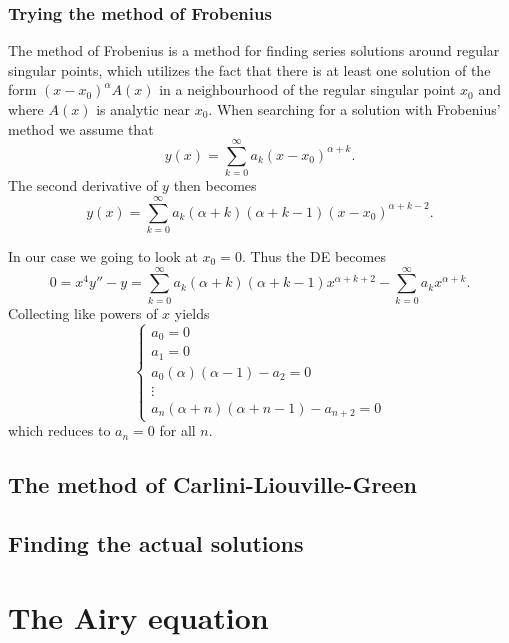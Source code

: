 \documentclass[11pt,letter, swedish, english
]{article}
\begin{document}
\subsubsection{Trying the method of Frobenius}
The method of Frobenius is a method for finding series solutions around
regular singular points, which utilizes the fact that there is 
at least one solution of the form $(x-x_0)^{\alpha}A(x)$ in a
neighbourhood of the regular singular point $x_0$ and where $A(x)$ is
analytic near $x_0$. When searching for a solution with Frobenius'
method we assume that
\begin{equation}
y(x)=\sum_{k=0}^\infty a_k (x-x_0)^{\alpha+k}.
\end{equation}
The second derivative of $y$ then becomes
\begin{equation}
y(x)=\sum_{k=0}^\infty a_k (\alpha+k)(\alpha+k-1) (x-x_0)^{\alpha+k-2}.
\end{equation}

In our case we going to look at $x_0=0$. Thus the DE becomes
\begin{equation}
0=x^4y''-y=
\sum_{k=0}^\infty a_k (\alpha+k)(\alpha+k-1) x^{\alpha+k+2}
-\sum_{k=0}^\infty a_k x^{\alpha+k}.
\end{equation}
Collecting like powers of $x$ yields
\begin{equation}
\begin{cases}
a_0=0\\
a_1=0\\
a_0(\alpha)(\alpha-1)-a_2=0\\
\vdots\\
a_n(\alpha+n)(\alpha+n-1)-a_{n+2}=0
\end{cases}
\end{equation}
which reduces to $a_n=0$ for all $n$.


\subsection{The method of Carlini-Liouville-Green}



\subsection{Finding the actual solutions}







\section{The Airy equation}
\end{document}
